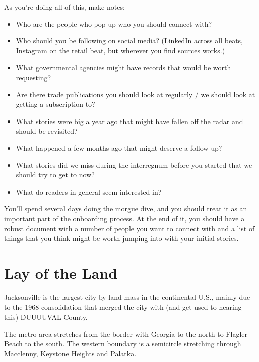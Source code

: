 \documentclass[
  11pt,
  american,
  letterpaperpaper,
  extrafontsizes,onecolumn,openright
  ]{memoir}
\providecommand{\tightlist}{%
  \setlength{\itemsep}{0pt}\setlength{\parskip}{0pt}}
\begin{document}
As you're doing all of this, make notes:

\begin{itemize}
\tightlist
\item
  Who are the people who pop up who you should connect with?
\item
  Who should you be following on social media? (LinkedIn across all beats, Instagram on the retail beat, but wherever you find sources works.)
\item
  What governmental agencies might have records that would be worth requesting?
\item
  Are there trade publications you should look at regularly / we should look at getting a subscription to?
\item
  What stories were big a year ago that might have fallen off the radar and should be revisited?
\item
  What happened a few months ago that might deserve a follow-up?
\item
  What stories did we miss during the interregnum before you started that we should try to get to now?
\item
  What do readers in general seem interested in?
\end{itemize}

\newpage

\leavevmode{}%
\begin{greybox}[frametitle=Onboarding Path]
You'll spend several days doing the morgue dive, and you should treat it as an important part of the onboarding process. At the end of it, you should have a robust document with a number of people you want to connect with and a list of things that you think might be worth jumping into with your initial stories.

\end{greybox}

\hypertarget{lay-of-the-land}{%
\section*{Lay of the Land}\label{lay-of-the-land}}

Jacksonville is the largest city by land mass in the continental U.S., mainly due to the 1968 consolidation that merged the city with (and get used to hearing this) DUUUUVAL County.

The metro area stretches from the border with Georgia to the north to Flagler Beach to the south. The western boundary is a semicircle stretching through Macclenny, Keystone Heights and Palatka.
\end{document}
